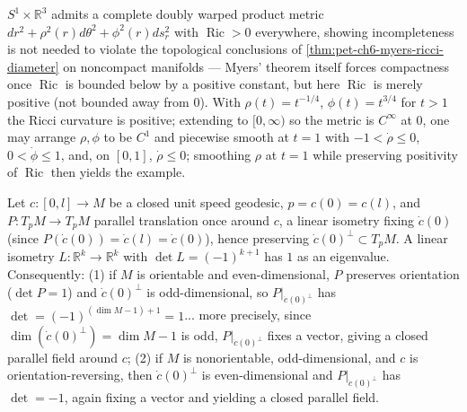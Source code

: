 \begin{example}
  \label{ex:pet-ch6-doubly-warped-ricci-positive}


  $S^1\times\mathbb{R}^3$ admits a complete doubly warped product metric
  $dr^2+\rho^2(r)d\theta^2+\phi^2(r)ds_r^2$ with $\operatorname{Ric}>0$ everywhere,
  showing incompleteness is not needed to violate the topological conclusions
  of \cref{thm:pet-ch6-myers-ricci-diameter} on noncompact manifolds — Myers'
  theorem itself forces compactness once $\operatorname{Ric}$ is bounded below by a
  positive constant, but here $\operatorname{Ric}$ is merely positive (not bounded
  away from $0$). With $\rho(t)=t^{-1/4}$, $\phi(t)=t^{3/4}$ for $t>1$ the
  Ricci curvature is positive; extending to $[0,\infty)$ so the metric is
  $C^\infty$ at $0$, one may arrange $\rho,\phi$ to be $C^1$ and piecewise
  smooth at $t=1$ with $-1<\dot\rho\le0$, $0<\dot\phi\le1$, and, on $[0,1]$,
  $\dot\rho\le0$; smoothing $\rho$ at $t=1$ while preserving positivity of
  $\operatorname{Ric}$ then yields the example.
\end{example}

\begin{remark}
  \label{rem:pet-ch6-closed-parallel-field-construction}


  Let $c:[0,l]\to M$ be a closed unit speed geodesic, $p=c(0)=c(l)$, and
  $P:T_pM\to T_pM$ parallel translation once around $c$, a linear isometry
  fixing $\dot c(0)$ (since $P(\dot c(0))=\dot c(l)=\dot c(0)$), hence
  preserving $\dot c(0)^\perp\subset T_pM$. A linear isometry
  $L:\mathbb{R}^k\to\mathbb{R}^k$ with $\det L=(-1)^{k+1}$ has $1$ as an eigenvalue.
  Consequently: (1) if $M$ is orientable and even-dimensional, $P$ preserves
  orientation ($\det P=1$) and $\dot c(0)^\perp$ is odd-dimensional, so
  $P|_{\dot c(0)^\perp}$ has $\det=(-1)^{(\dim M-1)+1}=1$... more precisely,
  since $\dim(\dot c(0)^\perp)=\dim M-1$ is odd, $P|_{\dot c(0)^\perp}$ fixes
  a vector, giving a closed parallel field around $c$; (2) if $M$ is
  nonorientable, odd-dimensional, and $c$ is orientation-reversing, then
  $\dot c(0)^\perp$ is even-dimensional and $P|_{\dot c(0)^\perp}$ has
  $\det=-1$, again fixing a vector and yielding a closed parallel field.
\end{remark}

